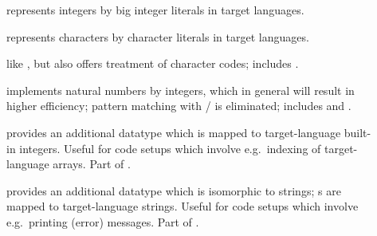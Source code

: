 \begin{isabellebody}
\begin{isamarkuptext}
  \begin{description}

    \item[] represents  integers by
       big integer literals in target languages.

    \item[] represents  characters by
       character literals in target languages.

    \item[] like , but
       also offers treatment of character codes; includes .

    \item[] \label{eff_nat} implements
       natural numbers by integers, which in general will result in
       higher efficiency; pattern matching with  /
        is eliminated; includes 
       and .

    \item[] provides an additional datatype
        which is mapped to target-language built-in
       integers.  Useful for code setups which involve e.g.~indexing
       of target-language arrays.  Part of .

    \item[] provides an additional datatype  which is isomorphic to strings; s are mapped to target-language strings.  Useful
       for code setups which involve e.g.~printing (error) messages.
       Part of .

  \end{description}


\end{isamarkuptext}
\end{isabellebody}
